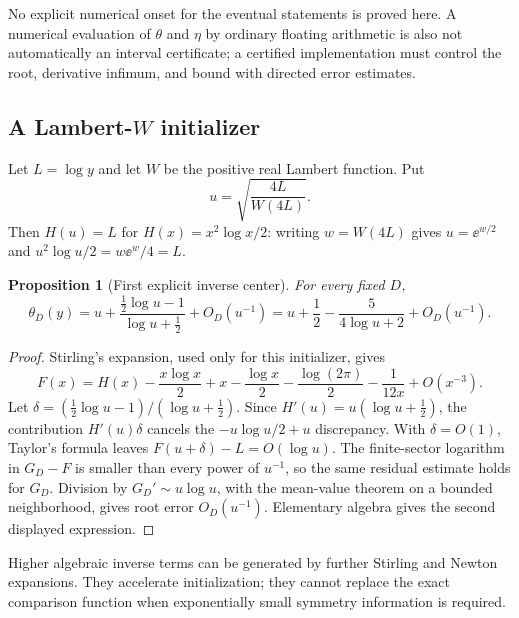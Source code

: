\documentclass[11pt,letterpaper]{article}
\numberwithin{equation}{section}
\newtheorem{proposition}[theorem]{Proposition}
\theoremstyle{definition}\newtheorem{definition}[theorem]{Definition}
\theoremstyle{remark}\newtheorem{remark}[theorem]{Remark}
\begin{document}
No explicit numerical onset for the eventual statements is proved here. A numerical evaluation of $\theta$ and $\eta$ by ordinary floating arithmetic is also not automatically an interval certificate; a certified implementation must control the root, derivative infimum, and bound with directed error estimates.

\subsection{A Lambert-$W$ initializer}
Let $L=\log y$ and let $W$ be the positive real Lambert function. Put
\begin{equation}\label{cmg:eq:u}
 u=\sqrt{\frac{4L}{W(4L)}}.
\end{equation}
Then $H(u)=L$ for $H(x)=x^2\log x/2$: writing $w=W(4L)$ gives $u=\ee^{w/2}$ and $u^2\log u/2=w\ee^w/4=L$.

\begin{proposition}[First explicit inverse center]\label{cmg:prop:initializer}
For every fixed $D$,
\begin{equation}\label{cmg:eq:initializer}
 \theta_D(y)=u+\frac{\frac12\log u-1}{\log u+\frac12}+O_D(u^{-1})
 =u+\frac12-\frac{5}{4\log u+2}+O_D(u^{-1}).
\end{equation}
\end{proposition}
\begin{proof}
Stirling's expansion, used only for this initializer, gives
\begin{equation}\label{cmg:eq:Fstirling}
 F(x)=H(x)-\frac{x\log x}{2}+x-\frac{\log x}{2}
 -\frac{\log(2\pi)}2-\frac1{12x}+O(x^{-3}).
\end{equation}
Let $\delta=(\frac12\log u-1)/(\log u+\frac12)$. Since $H'(u)=u(\log u+\frac12)$, the contribution $H'(u)\delta$ cancels the $-u\log u/2+u$ discrepancy. With $\delta=O(1)$, Taylor's formula leaves $F(u+\delta)-L=O(\log u)$. The finite-sector logarithm in $G_D-F$ is smaller than every power of $u^{-1}$, so the same residual estimate holds for $G_D$. Division by $G_D'\sim u\log u$, with the mean-value theorem on a bounded neighborhood, gives root error $O_D(u^{-1})$. Elementary algebra gives the second displayed expression.
\end{proof}

Higher algebraic inverse terms can be generated by further Stirling and Newton expansions. They accelerate initialization; they cannot replace the exact comparison function when exponentially small symmetry information is required.
\end{document}
